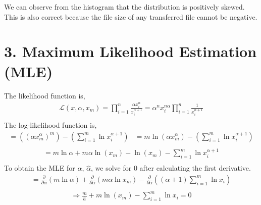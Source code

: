 \documentclass[11pt]{article}
\begin{document}
\par We can observe from the histogram that the distribution is positively skewed. This is also correct because the file size of any transferred file cannot be negative.

\section*{3. Maximum Likelihood Estimation (MLE)}

The likelihood function is,
\begin{equation}
\begin{split}
\mathcal{L}\left(x, \alpha, x_{m}\right)=\prod_{i=1}^{n} \frac{\alpha x_{i}^{\alpha}}{x_{i}^{\alpha+1}}=\alpha^{n} x_{i}^{n \alpha} \prod_{i=1}^{n} \frac{1}{x_{i}^{\alpha+1}} \\
\end{split}
\end{equation}
The log-likelihood function is,
\begin{equation}
\begin{split}
=\left(\left(\alpha x_{m}^{\alpha}\right)^{m}\right)-\left(\sum_{i=1}^{m} \ln x_{i}^{\alpha+1}\right) \\
\end{split}
\begin{split}
=m \ln \left(\alpha x_{m}^{\alpha}\right)- \left(\sum_{i=1}^{m}\ln x_{i}^{\alpha+1}\right) \\
\end{split}
\end{equation}
\begin{equation}
\begin{split}
=m \ln \alpha+m \alpha \ln \left(x_{m}\right)-\ln \left(x_{m}\right)- \sum_{i=1}^{m} \ln x_{i}^{\alpha+1} \\
\end{split}
\end{equation}
To obtain the MLE for $\alpha$, $\hat{\alpha}$, we solve for 0 after calculating the first derivative.
\begin{equation}
\begin{split}
=\frac{\partial}{\partial \alpha}(m \ln \alpha)+\frac{\partial}{\partial \alpha}\left(m \alpha \ln x_{m}\right)-\frac{\partial}{\partial \alpha}\left((\alpha+1) \sum_{i=1}^{m} \ln x_{i}\right) \\
\end{split}
\end{equation}
\begin{equation}
\begin{split}
\Rightarrow \frac{m}{\hat{a}}+m \ln \left(x_{m}\right)-\sum_{i=1}^{m} \ln x_i=0 \\
\end{split}
\end{equation}
\end{document}
